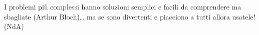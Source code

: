 
\vfill

\begin{enfasi}
{
I problemi più complessi hanno soluzioni semplici e facili da comprendere ma sbagliate (Arthur Bloch)… ma se sono divertenti e piacciono a tutti allora usatele! (NdA)
}
\end{enfasi}


%

\pagebreak

